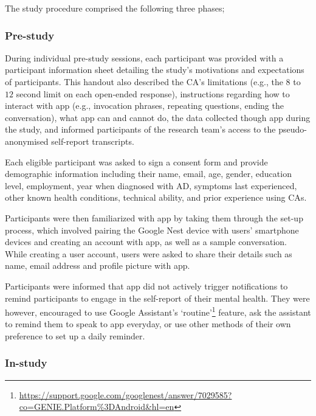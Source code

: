         The study procedure comprised the following three phases;
        
        \subsubsection{Pre-study}\label{sec:pre_study}
            
            During individual pre-study sessions, each participant was provided with a participant information sheet detailing the study's motivations and expectations of participants. This handout also described the \ac{CA}'s limitations (e.g., the $8$ to $12$ second limit on each open-ended response), instructions regarding how to interact with \acl{app} (e.g., invocation phrases, repeating questions, ending the conversation), what \acl{app} can and cannot do, the data collected though \acl{app} during the study, and informed participants of the research team's access to the pseudo-anonymised self-report transcripts.
                
            Each eligible participant was asked to sign a consent form and provide demographic information including their name, email, age, gender, education level, employment, year when diagnosed with \ac{AD}, symptoms last experienced, other known health conditions, technical ability, and prior experience using \ac{CA}s. 
                
            Participants were then familiarized with \acl{app} by taking them through the set-up process, which involved pairing the Google Nest device with users' smartphone devices and creating an account with \acl{app}, as well as a sample conversation. While creating a user account, users were asked to share their details such as name, email address and profile picture with \acl{app}.
                
            Participants were informed that \acl{app} did not actively trigger notifications to remind participants to engage in the self-report of their mental health. They were however, encouraged to use Google Assistant's `routine'\footnote{ \url{https://support.google.com/googlenest/answer/7029585?co=GENIE.Platform\%3DAndroid&hl=en}} feature, ask the assistant to remind them to speak to \acl{app} everyday, or use other methods of their own preference to set up a daily reminder.
                
        \subsubsection{In-study}\label{sec:in_study}

